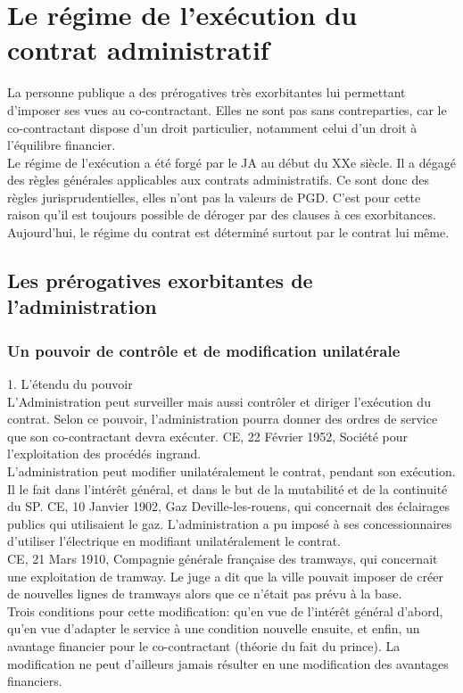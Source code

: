 \documentclass[10pt, a4paper, openany]{book}
\begin{document}
\section{Le régime de l'exécution du contrat administratif}

La personne publique a des prérogatives très exorbitantes lui permettant d'imposer ses vues au co-contractant. Elles ne sont pas sans contreparties, car le co-contractant dispose d'un droit particulier, notamment celui d'un droit à l'équilibre financier. \\
Le régime de l'exécution a été forgé par le JA au début du XXe siècle. Il a dégagé des règles générales applicables aux contrats administratifs. Ce sont donc des règles jurisprudentielles, elles n'ont pas la valeurs de PGD. C'est pour cette raison qu'il est toujours possible de déroger par des clauses à ces exorbitances. Aujourd'hui, le régime du contrat est déterminé surtout par le contrat lui même. 

\subsection{Les prérogatives exorbitantes de l'administration}

\subsubsection{Un pouvoir de contrôle et de modification unilatérale}

1. L'étendu du pouvoir \\
L'Administration peut surveiller mais aussi contrôler et diriger l'exécution du contrat. Selon ce pouvoir, l'administration pourra donner des ordres de service que son co-contractant devra exécuter. CE, 22 Février 1952, Société pour l'exploitation des procédés ingrand. \\
L'administration peut modifier unilatéralement le contrat, pendant son exécution. Il le fait dans l'intérêt général, et dans le but de la mutabilité et de la continuité du SP. CE, 10 Janvier 1902, Gaz Deville-les-rouens, qui concernait des éclairages publics qui utilisaient le gaz. L'administration a pu imposé à ses concessionnaires d'utiliser l'électrique en modifiant unilatéralement le contrat. \\
CE, 21 Mars 1910, Compagnie générale française des tramways, qui concernait une exploitation de tramway. Le juge a dit que la ville pouvait imposer de créer de nouvelles lignes de tramways alors que ce n'était pas prévu à la base. \\
Trois conditions pour cette modification: qu'en vue de l'intérêt général d'abord, qu'en vue d'adapter le service à une condition nouvelle ensuite, et enfin, un avantage financier pour le co-contractant (théorie du fait du prince). La modification ne peut d'ailleurs jamais résulter en une modification des avantages financiers.
\end{document}
